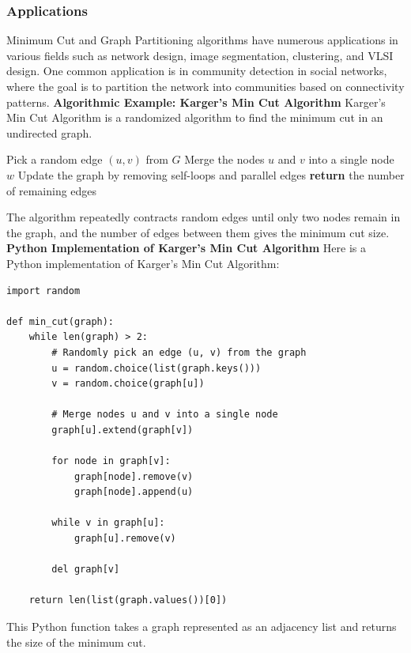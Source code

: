\documentclass[12pt]{book} %
\begin{document}
\subsubsection{Applications}
Minimum Cut and Graph Partitioning algorithms have numerous applications in various fields such as network design, image segmentation, clustering, and VLSI design. One common application is in community detection in social networks, where the goal is to partition the network into communities based on connectivity patterns.
\FloatBarrier
\textbf{Algorithmic Example: Karger's Min Cut Algorithm}
\FloatBarrier
Karger's Min Cut Algorithm is a randomized algorithm to find the minimum cut in an undirected graph.
\FloatBarrier
\begin{algorithm}
\caption{Karger's Min Cut Algorithm}
\begin{algorithmic}[1]
\State Pick a random edge $(u, v)$ from $G$
\State Merge the nodes $u$ and $v$ into a single node $w$
\State Update the graph by removing self-loops and parallel edges
\EndWhile
\State \textbf{return} the number of remaining edges
\EndProcedure
\end{algorithmic}
\end{algorithm}
\FloatBarrier
The algorithm repeatedly contracts random edges until only two nodes remain in the graph, and the number of edges between them gives the minimum cut size.
\FloatBarrier
\textbf{Python Implementation of Karger's Min Cut Algorithm}
\FloatBarrier
Here is a Python implementation of Karger's Min Cut Algorithm:
\FloatBarrier
\begin{lstlisting}
import random

def min_cut(graph):
    while len(graph) > 2:
        # Randomly pick an edge (u, v) from the graph
        u = random.choice(list(graph.keys()))
        v = random.choice(graph[u])
        
        # Merge nodes u and v into a single node
        graph[u].extend(graph[v])
        
        for node in graph[v]:
            graph[node].remove(v)
            graph[node].append(u)
        
        while v in graph[u]:
            graph[u].remove(v)
        
        del graph[v]
    
    return len(list(graph.values())[0])
\end{lstlisting}
\FloatBarrier
This Python function takes a graph represented as an adjacency list and returns the size of the minimum cut.
\end{document}
